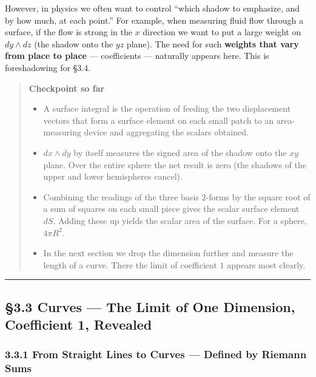 However, in physics we often want to control ``which shadow to
emphasize, and by how much, at each point.'' For example, when measuring
fluid flow through a surface, if the flow is strong in the \(x\)
direction we want to put a large weight on \(dy \wedge dz\) (the shadow
onto the \(yz\) plane). The need for such
\textbf{weights that vary from place to place} --- coefficients ---
naturally appears here. This is foreshadowing for §3.4.

\begin{quote}
\textbf{Checkpoint so far}

\begin{itemize}
\item
  A surface integral is the operation of feeding the two displacement
  vectors that form a surface element on each small patch to an
  area-measuring device and aggregating the scalars obtained.
\item
  \(dx \wedge dy\) by itself measures the signed area of the shadow onto
  the \(xy\) plane. Over the entire sphere the net result is zero (the
  shadows of the upper and lower hemispheres cancel).
\item
  Combining the readings of the three basis \(2\)-forms by the square
  root of a sum of squares on each small piece gives the scalar surface
  element \(dS\). Adding these up yields the scalar area of the surface.
  For a sphere, \(4\pi R^2\).
\item
  In the next section we drop the dimension further and measure the
  length of a curve. There the limit of coefficient \(1\) appears most
  clearly.
\end{itemize}
\end{quote}

\begin{center}\rule{0.5\linewidth}{0.5pt}\end{center}

\hypertarget{curves-the-limit-of-one-dimension-coefficient-1-revealed}{%
\subsection{§3.3 Curves --- The Limit of One Dimension, Coefficient 1,
Revealed}\label{curves-the-limit-of-one-dimension-coefficient-1-revealed}}

\hypertarget{from-straight-lines-to-curves-defined-by-riemann-sums}{%
\subsubsection{3.3.1 From Straight Lines to Curves --- Defined by
Riemann
Sums}\label{from-straight-lines-to-curves-defined-by-riemann-sums}}

